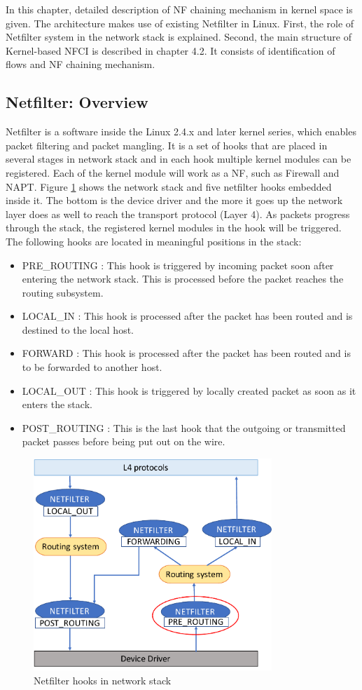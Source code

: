 In this chapter, detailed description of NF chaining mechanism in kernel space is given. 
The architecture makes use of existing Netfilter in Linux. First, the role of Netfilter system in the network stack is explained. Second, the main structure of Kernel-based NFCI is described in chapter 4.2. It consists of identification of flows and NF chaining mechanism. 

\subsection{Netfilter: Overview}
Netfilter is a software inside the Linux 2.4.x and later kernel series, which enables packet filtering and packet mangling. It is a set of hooks that are placed in several stages in network stack and in each hook multiple kernel modules can be registered. Each of the kernel module will work as a NF, such as Firewall and NAPT. 
Figure \ref{fig: netfilter_system} shows the network stack and five netfilter hooks embedded inside it. The bottom is the device driver and the more it goes up the network layer does as well to reach the transport protocol (Layer 4). As packets progress through the stack, the registered kernel modules in the hook will be triggered. 
The following hooks are located in meaningful positions in the stack:
\begin{itemize}
	\item PRE\_ROUTING : This hook is triggered by incoming packet soon after entering the network stack. This is processed before the packet reaches the routing subsystem.
	\item LOCAL\_IN : This hook is processed after the packet has been routed and is destined to the local host.
	\item FORWARD : This hook is processed after the packet has been routed and is to be forwarded to another host. 
	\item LOCAL\_OUT : This hook is triggered by locally created packet as soon as it enters the stack.
	\item POST\_ROUTING : This is the last hook that the outgoing or transmitted packet passes before being put out on the wire. 
\end{itemize}

\begin{figure}
	\centering
	\includegraphics[width=90mm]{pics/netfilter_system.pdf}
	\caption{Netfilter hooks in network stack}
	\label{fig: netfilter_system}
\end{figure}

